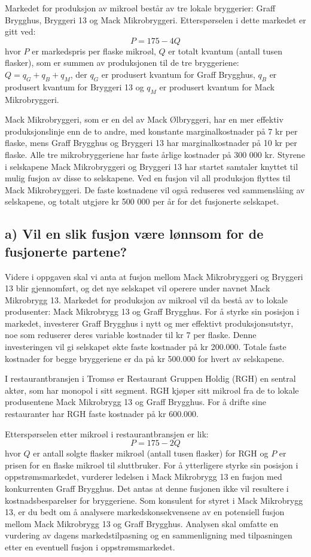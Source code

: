 \documentclass[
  12pt,
  a4paper,
  DIV=11,
  numbers=noendperiod]{scrartcl}
\begin{document}
Markedet for produksjon av mikroøl består av tre lokale bryggerier:
Graff Brygghus, Bryggeri 13 og Mack Mikrobryggeri. Etterspørselen i
dette markedet er gitt ved: \[
P = 175-4Q
\] hvor \(P\) er markedspris per flaske mikroøl, \(Q\) er totalt kvantum
(antall tusen flasker), som er summen av produksjonen til de tre
bryggeriene: \(Q = q_G + q_B + q_M\), der \(q_G\) er produsert kvantum
for Graff Brygghus, \(q_B\) er produsert kvantum for Bryggeri 13 og
\(q_M\) er produsert kvantum for Mack Mikrobryggeri.

Mack Mikrobryggeri, som er en del av Mack Ølbryggeri, har en mer
effektiv produksjonslinje enn de to andre, med konstante
marginalkostnader på 7 kr per flaske, mens Graff Brygghus og Bryggeri 13
har marginalkostnader på 10 kr per flaske. Alle tre mikrobryggeriene har
faste årlige kostnader på 300 000 kr. Styrene i selskapene Mack
Mikrobryggeri og Bryggeri 13 har startet samtaler knyttet til mulig
fusjon av disse to selskapene. Ved en fusjon vil all produksjon flyttes
til Mack Mikrobryggeri. De faste kostnadene vil også reduseres ved
sammenslåing av selskapene, og totalt utgjøre kr 500 000 per år for det
fusjonerte selskapet.

\subsection{a) Vil en slik fusjon være lønnsom for de fusjonerte
partene?}\label{a-vil-en-slik-fusjon-vuxe6re-luxf8nnsom-for-de-fusjonerte-partene}

Videre i oppgaven skal vi anta at fusjon mellom Mack Mikrobryggeri og
Bryggeri 13 blir gjennomført, og det nye selskapet vil operere under
navnet Mack Mikrobrygg 13. Markedet for produksjon av mikroøl vil da
bestå av to lokale produsenter: Mack Mikrobrygg 13 og Graff Brygghus.
For å styrke sin posisjon i markedet, investerer Graff Brygghus i nytt
og mer effektivt produksjonsutstyr, noe som reduserer deres variable
kostnader til kr 7 per flaske. Denne investeringen vil gi selskapet økte
faste kostnader på kr 200.000. Totale faste kostnader for begge
bryggeriene er da på kr 500.000 for hvert av selskapene.

I restaurantbransjen i Tromsø er Restaurant Gruppen Holdig (RGH) en
sentral aktør, som har monopol i sitt segment. RGH kjøper sitt mikroøl
fra de to lokale produsentene Mack Mikrobrygg 13 og Graff Brygghus. For
å drifte sine restauranter har RGH faste kostnader på kr 600.000.

Etterspørselen etter mikroøl i restaurantbransjen er lik: \[
P = 175 - 2Q
\] hvor \(Q\) er antall solgte flasker mikroøl (antall tusen flasker)
for RGH og \(P\) er prisen for en flaske mikroøl til sluttbruker. For å
ytterligere styrke sin posisjon i oppstrømsmarkedet, vurderer ledelsen i
Mack Mikrobrygg 13 en fusjon med konkurrenten Graff Brygghus. Det antas
at denne fusjonen ikke vil resultere i kostnadsbesparelser for
bryggeriene. Som konsulent for styret i Mack Mikrobrygg 13, er du bedt
om å analysere markedskonsekvensene av en potensiell fusjon mellom Mack
Mikrobrygg 13 og Graff Brygghus. Analysen skal omfatte en vurdering av
dagens markedstilpasning og en sammenligning med tilpasningen etter en
eventuell fusjon i oppstrømsmarkedet.
\end{document}
